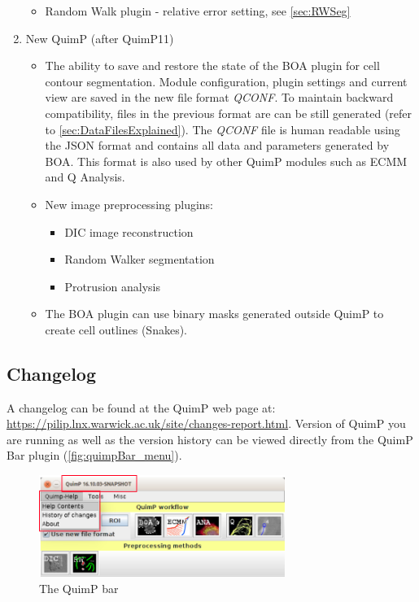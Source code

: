 \documentclass[a4paper,12pt]{article}
\begin{document}
\begin{enumerate}
\begin{itemize}
		\item Random Walk plugin - relative error setting, see \autoref{sec:RWSeg} 
	\end{itemize}
	\item New QuimP (after QuimP11)
	\begin{itemize}
		\item The ability to save and restore the state of the BOA plugin for cell contour segmentation. Module configuration, plugin settings and current view are saved in the new file format \textit{QCONF}. To maintain backward compatibility, files in the previous format are can be still generated (refer to \autoref{sec:DataFilesExplained}). The \textit{QCONF} file is human readable using the JSON format and contains all data and parameters generated by BOA. This format is also used by other QuimP modules such as ECMM and Q Analysis. 
		\item New image preprocessing plugins:
		\begin{itemize}
			\item DIC image reconstruction
			\item Random Walker segmentation
			\item Protrusion analysis
		\end{itemize}   
		\item The BOA plugin can use binary masks generated outside QuimP to create cell outlines (Snakes).
	\end{itemize}
\end{enumerate}
	
\subsection{Changelog}
A changelog can be found at the QuimP web page at: \url{https://pilip.lnx.warwick.ac.uk/site/changes-report.html}.
Version of QuimP you are running as well as the version history can be viewed directly from the QuimP Bar plugin (\autoref{fig:quimpBar_menu}).
\begin{figure}[ht]
	\centering
	\includegraphics[width=8cm]{quimpBar_menu.png} %
	\caption{The QuimP bar}
	\label{fig:quimpBar_menu}
\end{figure}
 	
\end{document}
